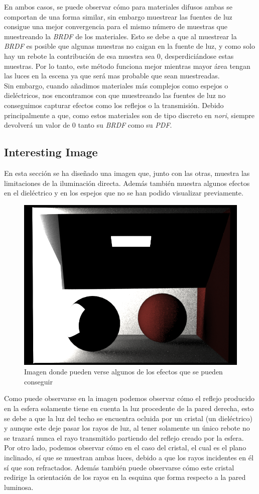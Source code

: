 \documentclass[10pt,oneside,a4paper]{article}
\begin{document}
 En ambos casos, se puede observar cómo para materiales difusos ambas se comportan de una forma similar, sin embargo muestrear las fuentes de luz consigue una mejor convergencia para el mismo número de muestras que muestreando la \textit{BRDF} de los materiales. Esto se debe a que al muestrear la \textit{BRDF} es posible que algunas muestras no caigan en la fuente de luz, y como solo hay un rebote la contribución de esa muestra sea 0, desperdiciándose estas muestras. Por lo tanto, este método funciona mejor mientras mayor área tengan las luces en la escena ya que será mas probable que sean muestreadas.\\
 
Sin embargo, cuando añadimos materiales más complejos como espejos o dieléctricos, nos encontramos con que muestreando las fuentes de luz no conseguimos capturar efectos como los reflejos o la transmisión. Debido principalmente a que, como estos materiales son de tipo discreto en \textit{nori}, siempre devolverá un valor de 0 tanto su \textit{BRDF} como su \textit{PDF}.\\
 
 \subsection{Interesting Image}
 En esta sección se ha diseñado una imagen que, junto con las otras, muestra las limitaciones de la iluminación directa. Además también muestra algunos efectos en el dieléctrico y en los espejos que no se han podido visualizar previamente.\\
 
 \begin{figure}[h]
\centering
\includegraphics[width=.6\linewidth]{images/cbox_interesting_512.png}
\caption{Imagen donde pueden verse algunos de los efectos que se pueden conseguir}
\label{fig:disp}
\end{figure}
 
 Como puede observarse en la imagen podemos observar cómo el reflejo producido en la esfera solamente tiene en cuenta la luz procedente de la pared derecha, esto se debe a que la luz del techo se encuentra ocluida por un cristal (un dieléctrico) y aunque este deje pasar los rayos de luz, al tener solamente un único rebote no se trazará nunca el rayo transmitido partiendo del reflejo creado por la esfera. Por otro lado, podemos observar cómo en el caso del cristal, el cual es el plano inclinado, sí que se muestran ambas luces, debido a que los rayos incidentes en él sí que son refractados. Además también puede observarse cómo este cristal redirige la orientación de los rayos en la esquina que forma respecto a la pared luminosa.
 
  
\end{document}
